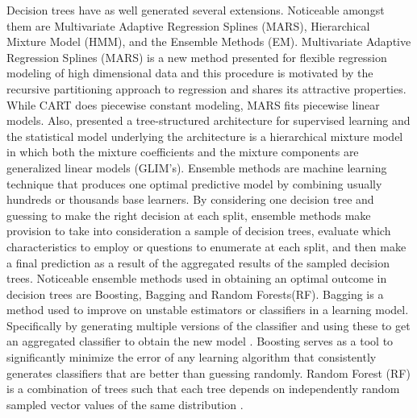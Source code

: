Decision trees have as well generated several extensions. Noticeable amongst them are Multivariate Adaptive Regression Splines (MARS), Hierarchical Mixture Model (HMM), and the Ensemble Methods (EM). Multivariate Adaptive Regression Splines (MARS) \citep{friedman1991multivariate} is a new method presented for flexible regression modeling of high dimensional data and this procedure is motivated by the recursive partitioning approach to regression and shares its attractive properties. While CART does piecewise constant modeling, MARS fits piecewise linear models. Also, \cite{jordan1994hierarchical} presented a tree-structured architecture for supervised learning and the statistical model underlying the architecture is a hierarchical mixture model in which both the mixture coefficients and the mixture components are generalized linear models (GLIM’s). Ensemble methods are machine learning technique that produces one optimal predictive model by combining usually hundreds or thousands base learners. By considering one decision tree and guessing to make the right decision at each split, ensemble methods make provision to take into consideration a sample of decision trees, evaluate which characteristics to employ or questions to enumerate at each split, and then make a final prediction as a result of the aggregated results of the sampled decision trees. Noticeable ensemble methods used in obtaining an optimal outcome in decision trees are Boosting, Bagging and Random Forests(RF). Bagging is a method used to improve on unstable estimators or classifiers in a learning model. Specifically by generating multiple versions of the classifier and using these to get an aggregated classifier to obtain the new model  \citep{breiman1996bagging}. Boosting \citep{freund1996experiments} serves as a tool to significantly minimize the error of any learning algorithm that consistently generates classifiers that are better than guessing randomly. Random Forest (RF) is a combination of trees such that each tree depends on independently random sampled vector values of the same distribution \cite{breiman2001random}.





